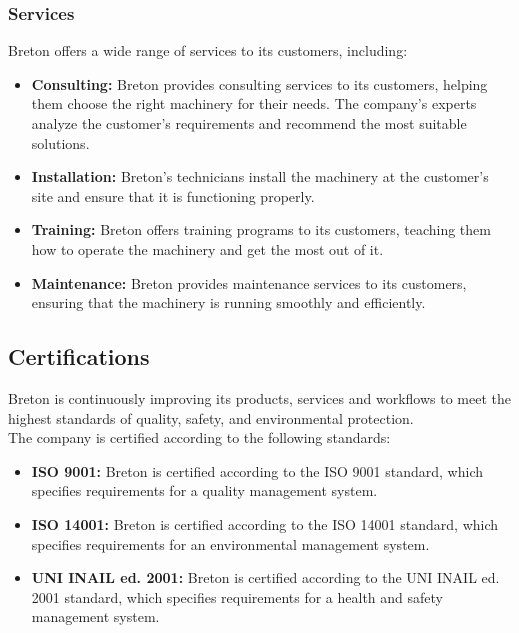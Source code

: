 \subsubsection{Services}
Breton offers a wide range of services to its customers, including:
\begin{itemize}
    \item \textbf{Consulting:} Breton provides consulting services to its customers, helping them choose the right machinery for their needs. The company's experts analyze the customer's requirements and recommend the most suitable solutions.
    \item \textbf{Installation:} Breton's technicians install the machinery at the customer's site and ensure that it is functioning properly.
    \item \textbf{Training:} Breton offers training programs to its customers, teaching them how to operate the machinery and get the most out of it.
    \item \textbf{Maintenance:} Breton provides maintenance services to its customers, ensuring that the machinery is running smoothly and efficiently.
\end{itemize}
\subsection{Certifications}
Breton is continuously improving its products, services and workflows to meet the highest standards of quality, safety, and environmental protection. \\
The company is certified according to the following standards:
\begin{itemize}
    \item \textbf{ISO 9001:} Breton is certified according to the ISO 9001 standard, which specifies requirements for a quality management system.
    \item \textbf{ISO 14001:} Breton is certified according to the ISO 14001 standard, which specifies requirements for an environmental management system.
    \item \textbf{UNI INAIL ed. 2001:} Breton is certified according to the UNI INAIL ed. 2001 standard, which specifies requirements for a health and safety management system.
\end{itemize}
